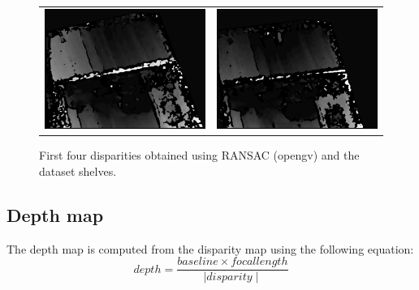 \documentclass[11pt]{report}
\begin{document}
\begin{figure}[H]
\begin{tabular}{cc}
    \includegraphics[scale=0.2]{images/disparity_2.png} &
    \includegraphics[scale=0.2]{images/disparity_3.png}
    \end{tabular}
    \caption{First four disparities obtained using RANSAC (opengv) and the dataset shelves.}
\end{figure}

\subsection{Depth map}
The depth map is computed from the disparity map using the following equation:
\begin{equation}
  depth = \frac{baseline \times focal length}{\mid disparity\mid} 
\end{equation}
\end{document}

